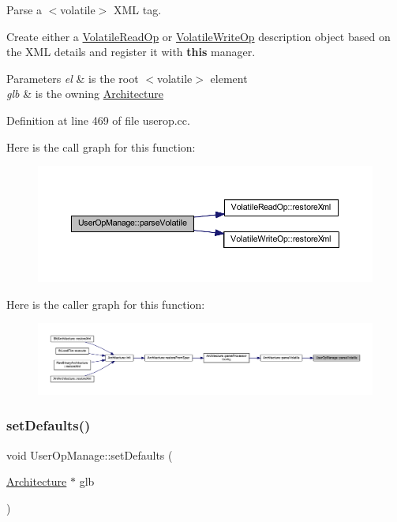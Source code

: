 Parse a $<$volatile$>$ X\+ML tag. 

Create either a \mbox{\hyperlink{class_volatile_read_op}{Volatile\+Read\+Op}} or \mbox{\hyperlink{class_volatile_write_op}{Volatile\+Write\+Op}} description object based on the X\+ML details and register it with {\bfseries{this}} manager. 
\begin{DoxyParams}{Parameters}
{\em el} & is the root $<$volatile$>$ element \\
\hline
{\em glb} & is the owning \mbox{\hyperlink{class_architecture}{Architecture}} \\
\hline
\end{DoxyParams}


Definition at line 469 of file userop.\+cc.

Here is the call graph for this function\+:
\nopagebreak
\begin{figure}[H]
\begin{center}
\leavevmode
\includegraphics[width=350pt]{class_user_op_manage_a643a087e70166f5e914673476c9189ba_cgraph}
\end{center}
\end{figure}
Here is the caller graph for this function\+:
\nopagebreak
\begin{figure}[H]
\begin{center}
\leavevmode
\includegraphics[width=350pt]{class_user_op_manage_a643a087e70166f5e914673476c9189ba_icgraph}
\end{center}
\end{figure}
\mbox{\label{class_user_op_manage_ac1fd9f8f2ee822b082ef0a3b1bcae120}} 
\subsubsection{\texorpdfstring{setDefaults()}{setDefaults()}}
{\footnotesize\ttfamily void User\+Op\+Manage\+::set\+Defaults (\begin{DoxyParamCaption}\item[{\mbox{\hyperlink{class_architecture}{Architecture}} $\ast$}]{glb }\end{DoxyParamCaption})}



